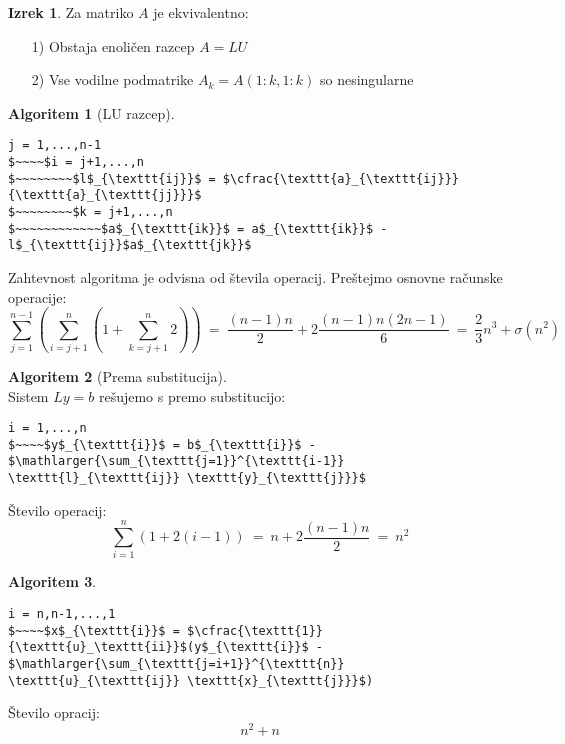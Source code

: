 \documentclass[11pt]{article}
\theoremstyle{definition}
\newtheorem{izrek}{Izrek}
\newtheorem*{algoritem}{Algoritem}
\begin{document}
\begin{izrek}

Za matriko $A$ je ekvivalentno:
\begin{enumerate}
	\item[1)] Obstaja enoličen razcep $A = LU$
	\item[2)] Vse vodilne podmatrike $A_k = A(1:k, 1:k)$ so nesingularne
\end{enumerate}

\end{izrek}
\vspace{0.5cm}

\begin{algoritem}[LU razcep]
~
\begin{lstlisting}
j = 1,...,n-1
$~~~~$i = j+1,...,n
$~~~~~~~~$l$_{\texttt{ij}}$ = $\cfrac{\texttt{a}_{\texttt{ij}}}{\texttt{a}_{\texttt{jj}}}$
$~~~~~~~~$k = j+1,...,n
$~~~~~~~~~~~~$a$_{\texttt{ik}}$ = a$_{\texttt{ik}}$ - l$_{\texttt{ij}}$a$_{\texttt{jk}}$
\end{lstlisting}
Zahtevnost algoritma je odvisna od števila operacij. Preštejmo osnovne računske operacije:
$$\sum_{j=1}^{n-1} \left( \sum_{i=j+1}^n \left( 1 + \sum_{k=j+1}^n 2 \right) \right) ~=~ \frac{(n-1)n}{2} + 2 \frac{(n-1)n(2n-1)}{6} ~=~ \frac{2}{3}n^3 + \sigma(n^2)$$

\end{algoritem}
\vspace{0.5cm}

\begin{algoritem}[Prema substitucija]
~\\
Sistem $Ly = b$ rešujemo s premo substitucijo:
\begin{lstlisting}
i = 1,...,n
$~~~~$y$_{\texttt{i}}$ = b$_{\texttt{i}}$ - $\mathlarger{\sum_{\texttt{j=1}}^{\texttt{i-1}} \texttt{l}_{\texttt{ij}} \texttt{y}_{\texttt{j}}}$
\end{lstlisting}
Število operacij:
$$\sum_{i=1}^n (1 + 2(i-1)) ~=~ n + 2\frac{(n-1)n}{2} ~=~ n^2$$

\end{algoritem}
\vspace{0.5cm}

\begin{algoritem}
~
\begin{lstlisting}
i = n,n-1,...,1
$~~~~$x$_{\texttt{i}}$ = $\cfrac{\texttt{1}}{\texttt{u}_\texttt{ii}}$(y$_{\texttt{i}}$ - $\mathlarger{\sum_{\texttt{j=i+1}}^{\texttt{n}} \texttt{u}_{\texttt{ij}} \texttt{x}_{\texttt{j}}}$)
\end{lstlisting}
Število opracij:
$$n^2 + n$$

\end{algoritem}
\vspace{0.5cm}
\end{document}
